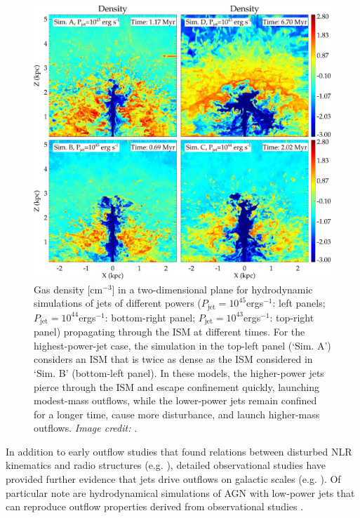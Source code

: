 \begin{figure}
    \centering
    \includegraphics[width=\linewidth]{figures/introduction/mukherjee2016_high_low_power_jets.jpeg}
    \caption[Snapshots of hydrodynamic simulations by \citet{Mukherjee2016} of a higher- and lower-power jet propagating through an ISM.]{Gas density [cm$^{-3}$] in a two-dimensional plane for hydrodynamic simulations of jets of different powers ($P_\mathrm{jet}=10^{45}$\;erg\;s$^{-1}$: left panels; $P_\mathrm{jet}=10^{44}$\;erg\;s$^{-1}$: bottom-right panel; $P_\mathrm{jet}=10^{43}$\;erg\;s$^{-1}$: top-right panel) propagating through the ISM at different times. For the highest-power-jet case, the simulation in the top-left panel (`Sim. A') considers an ISM that is twice as dense as the ISM considered in `Sim. B' (bottom-left panel). In these models, the higher-power jets pierce through the ISM and escape confinement quickly, launching modest-mass outflows, while the lower-power jets remain confined for a longer time, cause more disturbance, and launch higher-mass outflows. \textit{Image credit: \citet{Mukherjee2016}}.}
    \label{fig: introduction: outflows: acceleration_mechanisms: mukherjee2016_high_low_power_jets}
\end{figure}

In addition to early outflow studies that found relations between disturbed NLR kinematics and radio structures (e.g. \citealt{Wilson1985, Whittle1988}), detailed observational studies have provided further evidence that jets drive outflows on galactic scales (e.g. \citealt{Morganti1998, Morganti2007, Nesvadba2008, Rosario2010a, Rosario2010b, Rosario2010c, Morganti2013_4c1250, Tadhunter2014, Mahony2016, May2017, Audibert2019, May2020, Venturi2021}). Of particular note are hydrodynamical simulations of AGN with low-power jets that can reproduce outflow properties derived from observational studies \citep{Morganti2015, Mukherjee2018, Audibert2023}.

